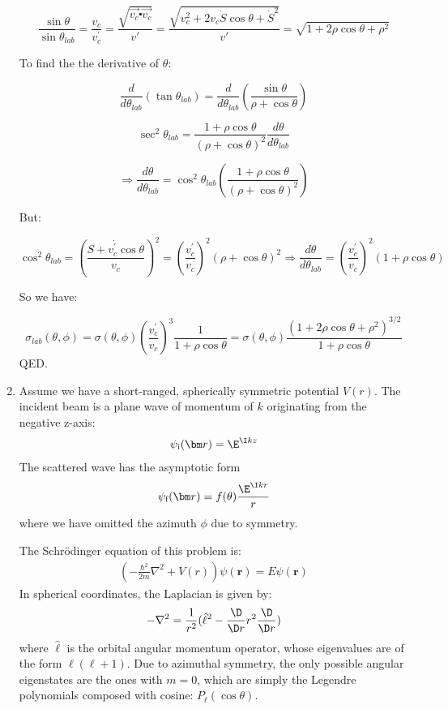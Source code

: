 \documentclass[fleqn, 12pt]{article}
\begin{document}
\begin{enumerate}
\[
\frac{\sin\theta}{\sin\theta_{lab}}=\frac{v_{c}}{v_{c}^{\prime}}=\frac{\sqrt{\vec{v_{c}}\centerdot\vec{v_{c}}}}{v'}=\frac{\sqrt{v_{c}^{2}+2v_{c}\dot{S}\cos\theta+\dot{S}^{2}}}{v'}=\sqrt{1+2\rho\cos\theta+\rho^{2}}
\]


To find the the derivative of $\theta$:

\[
\frac{d}{d\theta_{lab}}\left(\tan\theta_{lab}\right)=\frac{d}{d\theta_{lab}}\left(\frac{\sin\theta}{\rho+\cos\theta}\right)
\]


\[
\sec^{2}\theta_{lab}=\frac{1+\rho\cos\theta}{\left(\rho+\cos\theta\right)^{2}}\frac{d\theta}{d\theta_{lab}}
\]


\[
\Rightarrow\frac{d\theta}{d\theta_{lab}}=\cos^{2}\theta_{lab}\left(\frac{1+\rho\cos\theta}{\left(\rho+\cos\theta\right)^{2}}\right)
\]


But:

\[
\cos^{2}\theta_{lab}=\left(\frac{\dot{S+v_{c}^{\prime}\cos\theta}}{v_{c}}\right)^{2}=\left(\frac{v_{c}^{\prime}}{v_{c}}\right)^{2}\left(\rho+\cos\theta\right)^{2}\Rightarrow\frac{d\theta}{d\theta_{lab}}=\left(\frac{v_{c}^{\prime}}{v_{c}}\right)^{2}\left(1+\rho\cos\theta\right)
\]


So we have:

\[
\sigma_{lab}\left(\theta,\phi\right)=\sigma(\theta,\phi)\left(\frac{v_{c}^{\prime}}{v_{c}}\right)^{3}\frac{1}{1+\rho\cos\theta}=\sigma(\theta,\phi)\frac{\left(1+2\rho\cos\theta+\rho^{2}\right)^{3/2}}{1+\rho\cos\theta}
\]
 QED.

\item Assume we have a short-ranged, spherically symmetric potential $V(r)$.
  The incident beam is a plane wave of momentum of $k$ originating from the
  negative z-axis:
  \begin{align*}
    \psi_{\text i}(\bm r) = \E^{\I k z}
  \end{align*}
  The scattered wave has the asymptotic form
  \begin{align*}
    \psi_{\text f}(\bm r) = f(\theta) \frac{\E^{\I k r}}{r}
  \end{align*}
  where we have omitted the azimuth $\phi$ due to symmetry.

  The Schr\"odinger equation of this problem is:
  \begin{align*}
    \left(-\frac{\hbar^2}{2 m} \nabla^2 + V(r)\right) \psi(\bm r)
    = E \psi(\bm r)
  \end{align*}
  In spherical coordinates, the Laplacian is given by:
  \begin{align*}
  -\nabla^2 = \frac{1}{r^2} (\hat \ell^2 - \frac{\D}{\D r} r^2 \frac{\D}{\D r})
  \end{align*}
  where $\hat{\bm \ell}$ is the orbital angular momentum operator, whose
  eigenvalues are of the form $\ell (\ell + 1)$.  Due to azimuthal symmetry,
  the only possible angular eigenstates are the ones with $m = 0$, which are
  simply the Legendre polynomials composed with cosine: $P_\ell(\cos \theta)$.


\end{enumerate}
\end{document}
